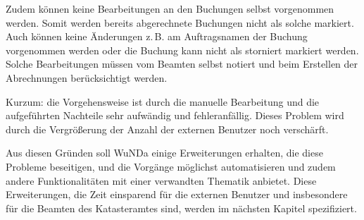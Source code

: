 \label{subsec:erstellen_abrechnung_storno}
Zudem können keine Bearbeitungen an den Buchungen selbst vorgenommen werden.
Somit werden bereits abgerechnete Buchungen nicht als solche markiert.
Auch können keine Änderungen z.\,B. am Auftragsnamen der Buchung vorgenommen werden oder die Buchung kann nicht als storniert markiert werden.
Solche Bearbeitungen müssen vom Beamten selbst notiert und beim Erstellen der Abrechnungen berücksichtigt werden.

Kurzum: die Vorgehensweise ist durch die manuelle Bearbeitung und die aufgeführten Nachteile sehr aufwändig und fehleranfällig. Dieses Problem wird durch die Vergrößerung der Anzahl der externen Benutzer noch verschärft.

Aus diesen Gründen soll \ac{WuNDa} einige Erweiterungen erhalten, die diese Probleme beseitigen, und die Vorgänge möglichst automatisieren und zudem andere Funktionalitäten mit einer verwandten Thematik anbietet.
Diese Erweiterungen, die Zeit einsparend für die externen Benutzer und insbesondere für die Beamten des Katasteramtes sind, werden im nächsten Kapitel spezifiziert.


%










